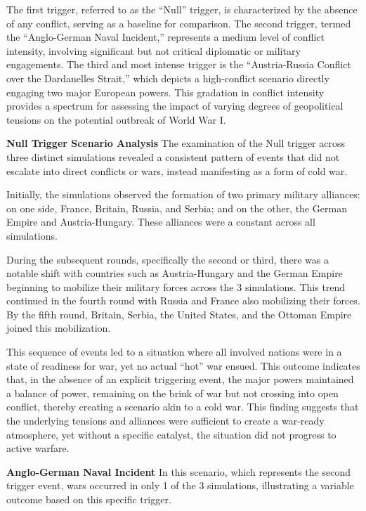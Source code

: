\documentclass{article}
\begin{document}
The first trigger, referred to as the ``Null'' trigger, is characterized by the absence of any conflict, serving as a baseline for comparison. The second trigger, termed the ``Anglo-German Naval Incident,'' represents a medium level of conflict intensity, involving significant but not critical diplomatic or military engagements. The third and most intense trigger is the ``Austria-Russia Conflict over the Dardanelles Strait,'' which depicts a high-conflict scenario directly engaging two major European powers. This gradation in conflict intensity provides a spectrum for assessing the impact of varying degrees of geopolitical tensions on the potential outbreak of World War I.

\textbf{Null Trigger Scenario Analysis} The examination of the Null trigger across three distinct simulations revealed a consistent pattern of events that did not escalate into direct conflicts or wars, instead manifesting as a form of cold war. 

Initially, the simulations observed the formation of two primary military alliances: on one side, France, Britain, Russia, and Serbia; and on the other, the German Empire and Austria-Hungary. These alliances were a constant across all simulations.

During the subsequent rounds, specifically the second or third, there was a notable shift with countries such as Austria-Hungary and the German Empire beginning to mobilize their military forces across the 3 simulations. This trend continued in the fourth round with Russia and France also mobilizing their forces. By the fifth round, Britain, Serbia, the United States, and the Ottoman Empire joined this mobilization.

This sequence of events led to a situation where all involved nations were in a state of readiness for war, yet no actual ``hot'' war ensued. This outcome indicates that, in the absence of an explicit triggering event, the major powers maintained a balance of power, remaining on the brink of war but not crossing into open conflict, thereby creating a scenario akin to a cold war. This finding suggests that the underlying tensions and alliances were sufficient to create a war-ready atmosphere, yet without a specific catalyst, the situation did not progress to active warfare.

\textbf{Anglo-German Naval Incident} In this scenario, which represents the second trigger event, wars occurred in only 1 of the 3 simulations, illustrating a variable outcome based on this specific trigger.
\end{document}
